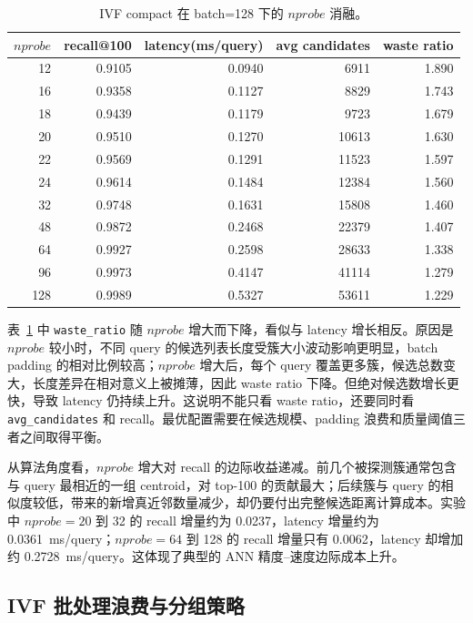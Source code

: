 \documentclass[10pt,a4paper]{article}
\newcommand{\msq}{ms/query}
\begin{document}
\begin{table}[H]
\centering
\small
\caption{IVF compact 在 batch=128 下的 $nprobe$ 消融。}
\label{tab:ivf-nprobe}
\begin{tabular}{rrrrr}
\toprule
$nprobe$ & recall@100 & latency(\msq) & avg candidates & waste ratio \\
\midrule
12  & 0.9105 & 0.0940 & 6911  & 1.890 \\
16  & 0.9358 & 0.1127 & 8829  & 1.743 \\
18  & 0.9439 & 0.1179 & 9723  & 1.679 \\
20  & 0.9510 & 0.1270 & 10613 & 1.630 \\
22  & 0.9569 & 0.1291 & 11523 & 1.597 \\
24  & 0.9614 & 0.1484 & 12384 & 1.560 \\
32  & 0.9748 & 0.1631 & 15808 & 1.460 \\
48  & 0.9872 & 0.2468 & 22379 & 1.407 \\
64  & 0.9927 & 0.2598 & 28633 & 1.338 \\
96  & 0.9973 & 0.4147 & 41114 & 1.279 \\
128 & 0.9989 & 0.5327 & 53611 & 1.229 \\
\bottomrule
\end{tabular}
\end{table}

表~\ref{tab:ivf-nprobe} 中 \texttt{waste\_ratio} 随 $nprobe$ 增大而下降，看似与 latency 增长相反。原因是 $nprobe$ 较小时，不同 query 的候选列表长度受簇大小波动影响更明显，batch padding 的相对比例较高；$nprobe$ 增大后，每个 query 覆盖更多簇，候选总数变大，长度差异在相对意义上被摊薄，因此 waste ratio 下降。但绝对候选数增长更快，导致 latency 仍持续上升。这说明不能只看 waste ratio，还要同时看 \texttt{avg\_candidates} 和 recall。最优配置需要在候选规模、padding 浪费和质量阈值三者之间取得平衡。

从算法角度看，$nprobe$ 增大对 recall 的边际收益递减。前几个被探测簇通常包含与 query 最相近的一组 centroid，对 top-100 的贡献最大；后续簇与 query 的相似度较低，带来的新增真近邻数量减少，却仍要付出完整候选距离计算成本。实验中 $nprobe=20$ 到 32 的 recall 增量约为 0.0237，latency 增量约为 0.0361~\msq{}；$nprobe=64$ 到 128 的 recall 增量只有 0.0062，latency 却增加约 0.2728~\msq{}。这体现了典型的 ANN 精度--速度边际成本上升。

\subsection{IVF 批处理浪费与分组策略}
\end{document}
